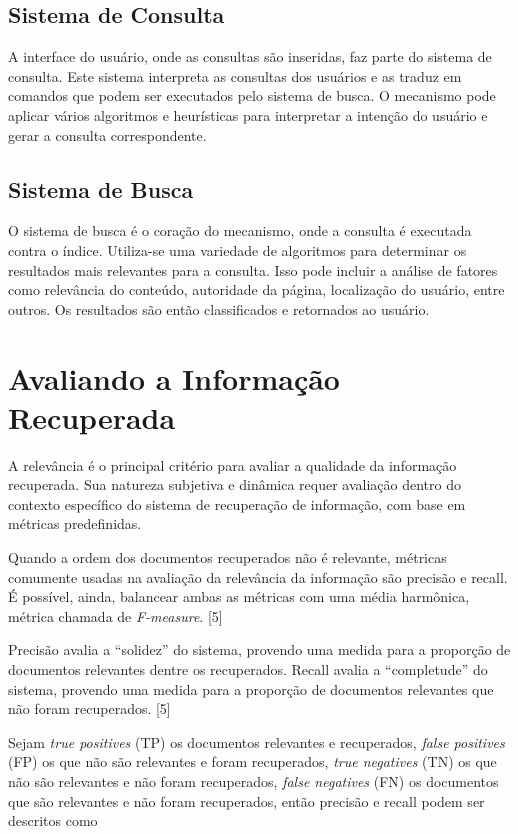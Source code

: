 \documentclass[
	12pt,				%
	openright,			%
	oneside,			%
	a4paper,			%
	english,			%
	french,				%
	spanish,			%
	brazil				%
	]{abntex2}
\begin{document}
\subsection{Sistema de Consulta}\label{subsec:sistema-de-consulta}
A interface do usuário, onde as consultas são inseridas, faz parte do sistema de consulta.
Este sistema interpreta as consultas dos usuários e as traduz em comandos que podem ser executados pelo sistema de busca.
O mecanismo pode aplicar vários algoritmos e heurísticas para interpretar a intenção do usuário e gerar a consulta
correspondente.

\subsection{Sistema de Busca}\label{subsec:sistema-de-busca}
O sistema de busca é o coração do mecanismo, onde a consulta é executada contra o índice.
Utiliza-se uma variedade de algoritmos para determinar os resultados mais relevantes para a consulta.
Isso pode incluir a análise de fatores como relevância do conteúdo, autoridade da página, localização do usuário,
entre outros.
Os resultados são então classificados e retornados ao usuário.


\section{Avaliando a Informação Recuperada}\label{sec:avaliando-a-informacao-recuperada}

A relevância é o principal critério para avaliar a qualidade da informação recuperada.
Sua natureza subjetiva e dinâmica requer avaliação dentro do contexto específico do sistema de recuperação de informação,
com base em métricas predefinidas.

Quando a ordem dos documentos recuperados não é relevante, métricas comumente usadas na avaliação da relevância da
informação são precisão e recall.
É possível, ainda, balancear ambas as métricas com uma média harmônica, métrica chamada de \textit{F-measure}.
[5]

Precisão avalia a ``solidez'' do sistema, provendo uma medida para a proporção de documentos relevantes dentre os
recuperados.
Recall avalia a ``completude'' do sistema, provendo uma medida para a proporção de documentos relevantes que não
foram recuperados.
[5]

Sejam \textit{true positives} (TP) os documentos relevantes e recuperados,
\textit{false positives} (FP) os que não são relevantes e foram recuperados,
\textit{true negatives} (TN) os que não são relevantes e não foram recuperados,
\textit{false negatives} (FN) os documentos que são relevantes e não foram recuperados,
então precisão e recall podem ser descritos como
\end{document}
